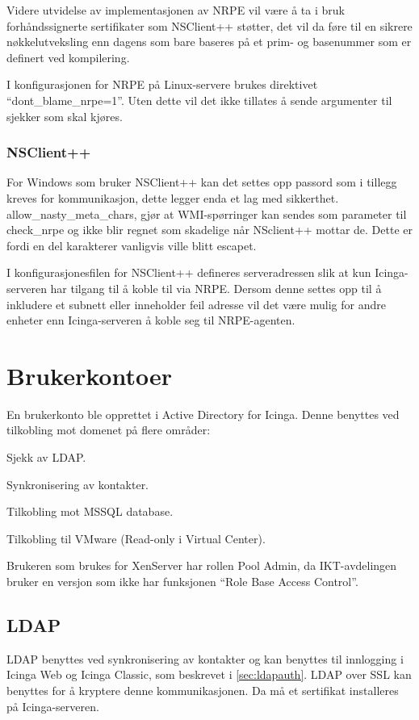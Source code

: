 Videre utvidelse av implementasjonen av NRPE vil være å ta i bruk forhåndssignerte sertifikater 
som NSClient++ støtter, det vil da føre til en sikrere nøkkelutveksling enn dagens som bare baseres på et prim- og basenummer som er definert ved kompilering.

I konfigurasjonen for NRPE på Linux-servere brukes direktivet ``dont\_blame\_nrpe=1''. Uten dette vil det ikke tillates å sende argumenter til sjekker som skal kjøres.
\subsubsection{NSClient++}
For Windows som bruker NSClient++ kan det settes opp passord som i tillegg kreves for kommunikasjon, dette legger enda et lag med sikkerthet.
allow\_nasty\_meta\_chars, gjør at WMI-spørringer kan sendes som parameter til check\_nrpe og ikke blir regnet som skadelige når NSclient++ mottar de. Dette er fordi en del karakterer vanligvis ville blitt escapet.

I konfigurasjonesfilen for NSClient++ defineres serveradressen slik at kun Icinga-serveren har tilgang til å koble til via NRPE. Dersom denne settes opp til å inkludere et subnett eller inneholder feil adresse vil det være mulig for andre enheter enn Icinga-serveren å koble seg til NRPE-agenten.

\section{Brukerkontoer}
En brukerkonto ble opprettet i Active Directory for Icinga. Denne benyttes ved tilkobling mot domenet på flere områder:
\begin{itemize*}
	\item Sjekk av LDAP.
	\item Synkronisering av kontakter.
	\item Tilkobling mot MSSQL database.
	\item Tilkobling til VMware (Read-only i Virtual Center).
\end{itemize*}
Brukeren som brukes for XenServer har rollen Pool Admin, da IKT-avdelingen bruker en versjon som ikke har funksjonen ``Role Base Access Control''. 

\subsection{LDAP}
LDAP benyttes ved synkronisering av kontakter og kan benyttes til innlogging i Icinga Web og Icinga Classic, som beskrevet i \ref{sec:ldapauth}. LDAP over SSL kan benyttes for å kryptere denne kommunikasjonen. Da må et sertifikat installeres på Icinga-serveren.

